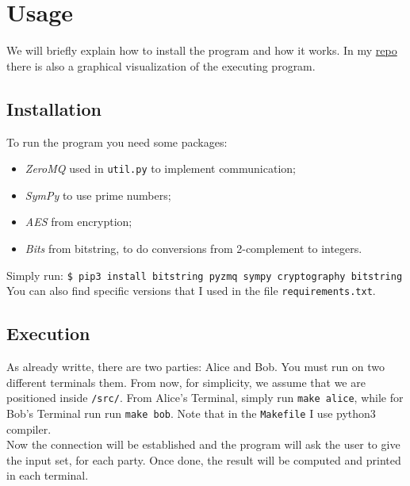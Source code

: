 \documentclass[12pt]{article}
\newcommand{\inlinecode}{\texttt}
\begin{document}
\section{Usage}
We will briefly explain how to install the program and how it works. In my \hyperref[zanoGit]{repo} there is also a graphical visualization of the executing program. 
\subsection{Installation}
To run the program you need some packages:
\begin{itemize}
    \item \textit{ZeroMQ} used in \inlinecode{util.py} to implement communication;
    \item \textit{SymPy} to use prime numbers;
    \item \textit{AES} from encryption;
    \item \textit{Bits} from bitstring, to do conversions from 2-complement to integers.
\end{itemize}
Simply run: 
\inlinecode{\$ pip3 install bitstring pyzmq sympy cryptography bitstring}\\
You can also find specific versions that I used in the file \inlinecode{requirements.txt}.
\subsection{Execution}
As already writte, there are two parties: Alice and Bob. You must run on two different terminals them. From now, for simplicity, we assume that we are positioned inside \inlinecode{/src/}.
From Alice's Terminal, simply run \inlinecode{make alice}, while for Bob's Terminal run run \inlinecode{make bob}. Note that in the \inlinecode{Makefile} I use python3 compiler.\\
Now the connection will be established and the program will ask the user to give the input set, for each party. Once done, the result will be computed and printed in each terminal.
\end{document}
